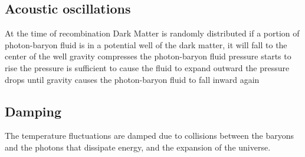 \documentclass{article}
\begin{document}
\subsection{Acoustic oscillations}
At the time of recombination
Dark Matter is randomly distributed
if a portion of photon-baryon fluid is in a potential well of the dark matter, it will fall to the center of the well
gravity compresses the photon-baryon fluid
pressure starts to rise
the pressure is sufficient to cause the fluid to expand outward
the pressure drops until gravity causes the photon-baryon fluid to fall inward again

\subsection{Damping}
The temperature fluctuations are damped due to collisions between the baryons and the photons that dissipate energy, and the expansion of the universe.
\end{document}
